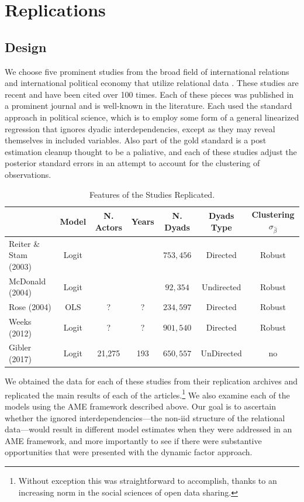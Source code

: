 \section{Replications}
 
\subsection{Design}

We choose five prominent studies from the broad field of international relations and international political economy that utilize relational data \citep{reiter:stam:2003, mcdonald:2004,  rose:2004, weeks:2012, gibler:2017}. These studies are recent and have been cited over 100 times. Each of these pieces was published in a prominent journal and is well-known in the literature. Each used the standard approach in political science, which is to employ some form of a general linearized regression that ignores dyadic interdependencies, except as they may reveal themselves in included variables. Also part of the gold standard is a post estimation cleanup thought to be a paliative, and each of these studies adjust the posterior standard errors in an attempt to account for the clustering of observations.

\begin{table}
\caption{Features of the Studies Replicated. }
	\begin{tabular}{lcccccc}
& Model & N. Actors & Years  & N. Dyads & Dyads Type & Clustering $\sigma_{\hat{\beta}}$ \\ \toprule
Reiter \& Stam (2003) & Logit & & & $753,456$ & Directed & Robust \\	McDonald (2004) & Logit & & & $92,354$ & Undirected & Robust\\
Rose (2004) & OLS & ? &  ?& $234,597$ & Directed & Robust \\	 
Weeks (2012) & Logit & ? & ?& $901,540$ & Directed & Robust \\
Gibler (2017) & Logit & 21,275 & 193 & $650,557$ & UnDirected & no \\ \bottomrule
	\end{tabular}
\end{table}

We obtained the data for each of these studies from their replication archives and replicated the main results of each of the articles.\footnote{Without exception this was straightforward to accomplish, thanks to an increasing norm in the social sciences of open data sharing.} We also examine each of the models using the AME framework described above.  Our goal is to ascertain whether the ignored interdependencies---the non-iid structure of the relational data---would result in different model estimates when they were addressed in an AME framework, and more importantly to see if there were substantive opportunities that were presented with the dynamic factor approach.  

